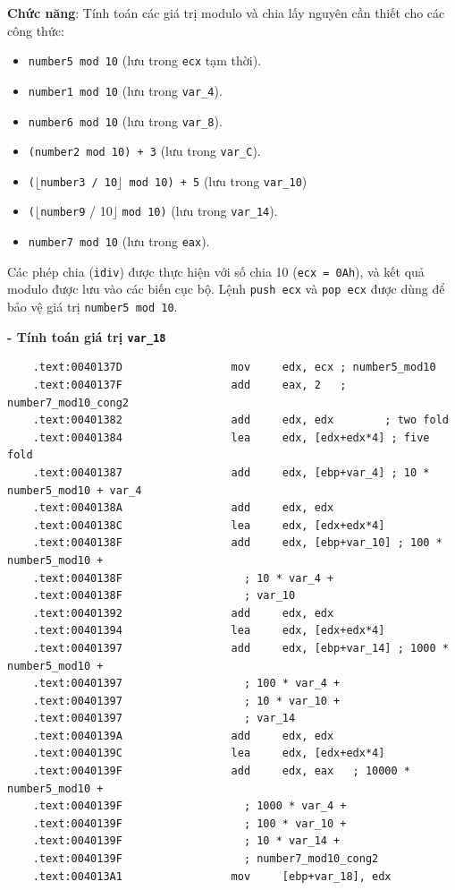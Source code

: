 \textbf{Chức năng}: Tính toán các giá trị modulo và chia lấy nguyên cần thiết cho các công thức:
\begin{itemize}
	\item \texttt{number5 mod 10} (lưu trong \texttt{ecx} tạm thời).
	\item \texttt{number1 mod 10} (lưu trong \texttt{var\_4}).
	\item \texttt{number6 mod 10} (lưu trong \texttt{var\_8}).
	\item \texttt{(number2 mod 10) + 3} (lưu trong \texttt{var\_C}).
	\item \texttt{(\(\lfloor\)number3 / 10\(\rfloor\) mod 10) + 5} (lưu trong \texttt{var\_10})
	\item \texttt{(}\(\lfloor\)\texttt{number9} / 10\(\rfloor\) \texttt{mod 10}\texttt{)} (lưu trong \texttt{var\_14}).
	\item \texttt{number7 mod 10} (lưu trong \texttt{eax}).
\end{itemize}
Các phép chia (\texttt{idiv}) được thực hiện với số chia 10 (\texttt{ecx = 0Ah}), và kết quả modulo được lưu vào các biến cục bộ. Lệnh \texttt{push ecx} và \texttt{pop ecx} được dùng để bảo vệ giá trị \texttt{number5 mod 10}.

\textbf{- Tính toán giá trị \texttt{var\_18}}

\begin{lstlisting}
	.text:0040137D                 mov     edx, ecx ; number5_mod10
	.text:0040137F                 add     eax, 2   ; number7_mod10_cong2
	.text:00401382                 add     edx, edx        ; two fold
	.text:00401384                 lea     edx, [edx+edx*4] ; five fold
	.text:00401387                 add     edx, [ebp+var_4] ; 10 * number5_mod10 + var_4
	.text:0040138A                 add     edx, edx
	.text:0040138C                 lea     edx, [edx+edx*4]
	.text:0040138F                 add     edx, [ebp+var_10] ; 100 * number5_mod10 +
	.text:0040138F                   ; 10 * var_4 +
	.text:0040138F                   ; var_10
	.text:00401392                 add     edx, edx
	.text:00401394                 lea     edx, [edx+edx*4]
	.text:00401397                 add     edx, [ebp+var_14] ; 1000 * number5_mod10 +
	.text:00401397                   ; 100 * var_4 +
	.text:00401397                   ; 10 * var_10 +
	.text:00401397                   ; var_14
	.text:0040139A                 add     edx, edx
	.text:0040139C                 lea     edx, [edx+edx*4]
	.text:0040139F                 add     edx, eax   ; 10000 * number5_mod10 +
	.text:0040139F                   ; 1000 * var_4 +
	.text:0040139F                   ; 100 * var_10 +
	.text:0040139F                   ; 10 * var_14 +
	.text:0040139F                   ; number7_mod10_cong2
	.text:004013A1                 mov     [ebp+var_18], edx
\end{lstlisting}

